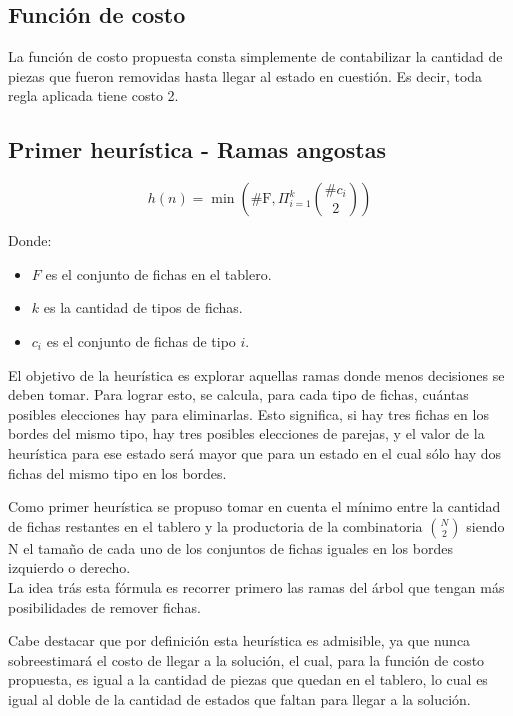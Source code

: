 \documentclass[a4paper,10pt]{article}
\begin{document}
    \subsection{Función de costo}

    La función de costo propuesta consta simplemente de contabilizar la cantidad de piezas que fueron removidas hasta llegar al estado en cuestión. Es decir, toda regla aplicada 
    tiene costo 2. \\

    \subsection{Primer heurística - Ramas angostas}
    
    \[ h(n) = \min \left (\text{\# F}, \Pi_{i=1}^{k} {\# c_i \choose 2} \right )\] 

    Donde:
    \begin{itemize}
        \item $F$ es el conjunto de fichas en el tablero.
        \item $k$ es la cantidad de tipos de fichas.
        \item $c_i$ es el conjunto de fichas de tipo $i$.
    \end{itemize}

    El objetivo de la heurística es explorar aquellas ramas donde menos decisiones se deben tomar. Para lograr esto, se calcula, para cada tipo de fichas, cuántas posibles elecciones hay para eliminarlas. Esto significa, si hay tres fichas en los bordes del mismo tipo, hay tres posibles elecciones de parejas, y el valor de la heurística para ese estado será mayor que para un estado en el cual sólo hay dos fichas del mismo tipo en los bordes.


    Como primer heurística se propuso tomar en cuenta el mínimo entre la cantidad de fichas restantes en el tablero y la productoria de la combinatoria  
    ${N \choose 2}$ siendo N el tamaño de cada uno de los conjuntos de fichas iguales en los bordes izquierdo o derecho.\\

    La idea trás esta fórmula es recorrer primero las ramas del árbol que tengan más posibilidades de remover fichas.

    Cabe destacar que por definición esta heurística es admisible, ya que nunca sobreestimará el costo de llegar a la solución, el cual, para la función de costo propuesta, es 
    igual a la cantidad de piezas que quedan en el tablero, lo cual es igual al doble de la cantidad de estados que faltan para llegar a la solución.
\end{document}
